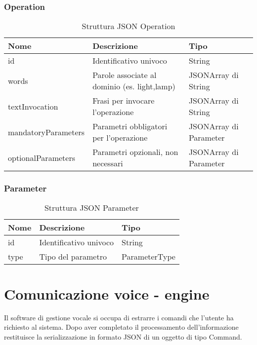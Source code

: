 \documentclass[twoside]{supsistudent}
\begin{document}
\subsection{Operation}
\begin{table}[H]
\centering
\caption{Struttura JSON Operation}
\label{Struttura JSON Operation}
\begin{tabular}{@{}|l|l|l|@{}}
\toprule
Nome                & Descrizione                                                               & Tipo                   \\ \midrule
id                  & Identificativo univoco                                                    & String                 \\ \midrule
words               & Parole associate al dominio (es. light,lamp)                     & JSONArray di String    \\ \midrule
textInvocation      & Frasi per invocare l'operazione         & JSONArray di String    \\ \midrule
mandatoryParameters & Parametri obbligatori per l'operazione     & JSONArray di Parameter \\ \midrule
optionalParameters  & Parametri opzionali, non necessari & JSONArray di Parameter \\ \bottomrule
\end{tabular}
\end{table}

\subsection{Parameter}
\begin{table}[H]
\centering
\caption{Struttura JSON Parameter}
\label{Struttura JSON Parameter}
\begin{tabular}{@{}|l|l|l|@{}}
\toprule
Nome & Descrizione            & Tipo          \\ \midrule
id   & Identificativo univoco & String        \\ \midrule
type & Tipo del parametro     & ParameterType \\ \bottomrule
\end{tabular}
\end{table}

\chapter{Comunicazione voice - engine }
Il software di gestione vocale si occupa di estrarre i comandi che l'utente ha richiesto al sistema. Dopo aver completato il processamento dell'informazione restituisce la serializzazione in formato JSON di un oggetto di tipo Command.
\end{document}
